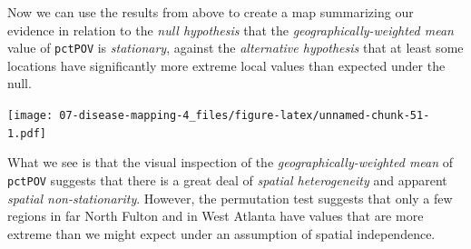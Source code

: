 \documentclass[
]{book}
\newenvironment{Shaded}{\begin{snugshade}}{\end{snugshade}}
\newcommand{\AttributeTok}[1]{\textcolor[rgb]{0.77,0.63,0.00}{#1}}
\newcommand{\DecValTok}[1]{\textcolor[rgb]{0.00,0.00,0.81}{#1}}
\newcommand{\FunctionTok}[1]{\textcolor[rgb]{0.00,0.00,0.00}{#1}}
\newcommand{\NormalTok}[1]{#1}
\newcommand{\SpecialCharTok}[1]{\textcolor[rgb]{0.00,0.00,0.00}{#1}}
\newcommand{\StringTok}[1]{\textcolor[rgb]{0.31,0.60,0.02}{#1}}
\begin{document}
Now we can use the results from above to create a map summarizing our evidence in relation to the \emph{null hypothesis} that the \emph{geographically-weighted mean} value of \texttt{pctPOV} is \emph{stationary}, against the \emph{alternative hypothesis} that at least some locations have significantly more extreme local values than expected under the null.

\begin{Shaded}
\end{Shaded}

\texttt{[image: 07-disease-mapping-4\_files/figure-latex/unnamed-chunk-51-1.pdf]}

What we see is that the visual inspection of the \emph{geographically-weighted mean} of \texttt{pctPOV} suggests that there is a great deal of \emph{spatial heterogeneity} and apparent \emph{spatial non-stationarity}. However, the permutation test suggests that only a few regions in far North Fulton and in West Atlanta have values that are more extreme than we might expect under an assumption of spatial independence.
\end{document}
